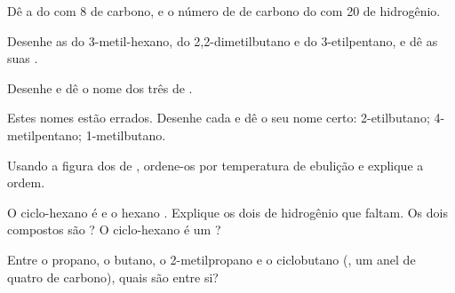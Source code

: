 \begin{exercise}[$\star$]\label{exo:g11:organic-skeletons:5}
Dê a  do  com 8  de carbono, e o número de
 de carbono do  com 20  de hidrogênio.
\end{exercise}

\begin{exercise}[$\star\star$]\label{exo:g11:organic-skeletons:6}
Desenhe as  do 3-metil-hexano, do 2,2-dimetilbutano e
do 3-etilpentano, e dê as suas .
\end{exercise}

\begin{exercise}[$\star\star$]\label{exo:g11:organic-skeletons:7}
Desenhe e dê o nome dos três  de .
\end{exercise}

\begin{exercise}[$\star\star$]\label{exo:g11:organic-skeletons:8}
Estes nomes estão errados. Desenhe cada  e dê o seu nome certo:
2-etilbutano; 4-metilpentano; 1-metilbutano.
\end{exercise}

\begin{exercise}[$\star\star$]\label{exo:g11:organic-skeletons:9}
Usando a figura dos  de , ordene-os por temperatura
de ebulição e explique a ordem.
\end{exercise}

\begin{exercise}[$\star\star$]\label{exo:g11:organic-skeletons:10}
O ciclo-hexano é  e o hexano . Explique os dois
 de hidrogênio que faltam. Os dois compostos são ? O
ciclo-hexano é um ?
\end{exercise}

\begin{exercise}[$\star\star$]\label{exo:g11:organic-skeletons:11}
Entre o propano, o butano, o 2-metilpropano e o ciclobutano (,
um anel de quatro  de carbono), quais são  entre si?
\end{exercise}

